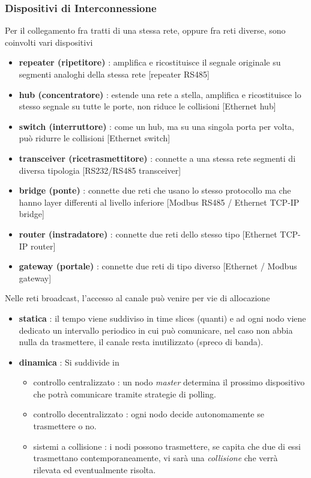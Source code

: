 \documentclass[10pt, letterpaper]{report}
\begin{document}
\subsubsection{Dispositivi di Interconnessione}
Per il collegamento fra tratti di una stessa rete, oppure fra reti diverse, sono coinvolti vari dispositivi\begin{itemize}
    \item \textbf{repeater (ripetitore)} : amplifica e ricostituisce il segnale originale su segmenti analoghi della
    stessa rete [repeater RS485]
    \item   \textbf{hub (concentratore)} : estende una rete a stella, amplifica e ricostituisce lo stesso segnale su
    tutte le porte, non riduce le collisioni [Ethernet hub] 
    \item  \textbf{switch (interruttore)} : come un hub, ma su una singola porta per volta, può ridurre le
    collisioni [Ethernet switch]
    \item \textbf{transceiver (ricetrasmettitore)} : connette a una stessa rete segmenti di diversa tipologia
    [RS232/RS485 transceiver]
    \item \textbf{bridge (ponte)} : connette due reti che usano lo stesso protocollo ma che hanno layer
    differenti al livello inferiore [Modbus RS485 / Ethernet TCP-IP bridge]
    \item  \textbf{router (instradatore)} : connette due reti dello stesso tipo [Ethernet TCP-IP router] 
    \item \textbf{gateway (portale)} : connette due reti di tipo diverso [Ethernet / Modbus gateway] 
\end{itemize}
Nelle reti broadcast, l'accesso al canale può venire per vie di allocazione \begin{itemize}
    \item \textbf{statica} :  il tempo viene suddiviso in time slices (quanti) e ad ogni nodo 
    viene dedicato un intervallo periodico in cui può comunicare, nel caso non abbia nulla 
    da trasmettere, il canale resta inutilizzato (spreco di banda). 
    \item \textbf{dinamica} : Si suddivide in \begin{itemize}
        \item controllo centralizzato : un nodo \textit{master} determina il prossimo 
        dispositivo che potrà comunicare tramite strategie di polling. 
        \item controllo decentralizzato : ogni nodo decide autonomamente se trasmettere o no. 
        \item sistemi a collisione : i nodi possono trasmettere, se capita che due di essi 
        trasmettano contemporaneamente, vi sarà una \textit{collisione} che verrà 
        rilevata ed eventualmente risolta.
    \end{itemize}
\end{itemize}
\end{document}
